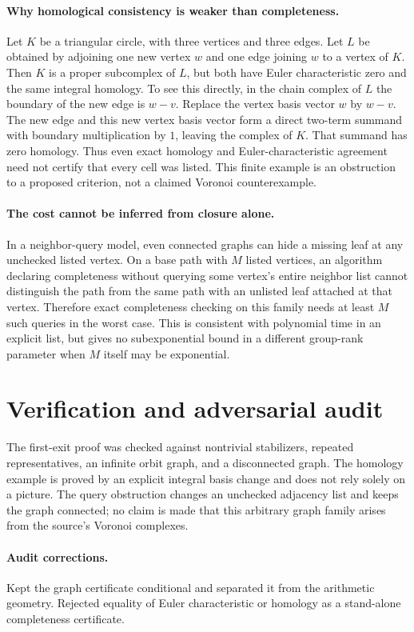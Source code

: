 \documentclass[11pt]{article}
\begin{document}
\paragraph{Why homological consistency is weaker than completeness.}
Let $K$ be a triangular circle, with three vertices and three edges. Let $L$ be obtained by adjoining one new vertex $w$ and one edge joining $w$ to a vertex of $K$. Then $K$ is a proper subcomplex of $L$, but both have Euler characteristic zero and the same integral homology. To see this directly, in the chain complex of $L$ the boundary of the new edge is $w-v$. Replace the vertex basis vector $w$ by $w-v$. The new edge and this new vertex basis vector form a direct two-term summand with boundary multiplication by $1$, leaving the complex of $K$. That summand has zero homology. Thus even exact homology and Euler-characteristic agreement need not certify that every cell was listed. This finite example is an obstruction to a proposed criterion, not a claimed Voronoi counterexample.

\paragraph{The cost cannot be inferred from closure alone.}
In a neighbor-query model, even connected graphs can hide a missing leaf at any unchecked listed vertex. On a base path with $M$ listed vertices, an algorithm declaring completeness without querying some vertex's entire neighbor list cannot distinguish the path from the same path with an unlisted leaf attached at that vertex. Therefore exact completeness checking on this family needs at least $M$ such queries in the worst case. This is consistent with polynomial time in an explicit list, but gives no subexponential bound in a different group-rank parameter when $M$ itself may be exponential.
\section{Verification and adversarial audit}
The first-exit proof was checked against nontrivial stabilizers, repeated representatives, an infinite orbit graph, and a disconnected graph. The homology example is proved by an explicit integral basis change and does not rely solely on a picture. The query obstruction changes an unchecked adjacency list and keeps the graph connected; no claim is made that this arbitrary graph family arises from the source's Voronoi complexes.
\paragraph{Audit corrections.} Kept the graph certificate conditional and separated it from the arithmetic geometry. Rejected equality of Euler characteristic or homology as a stand-alone completeness certificate.
\end{document}
